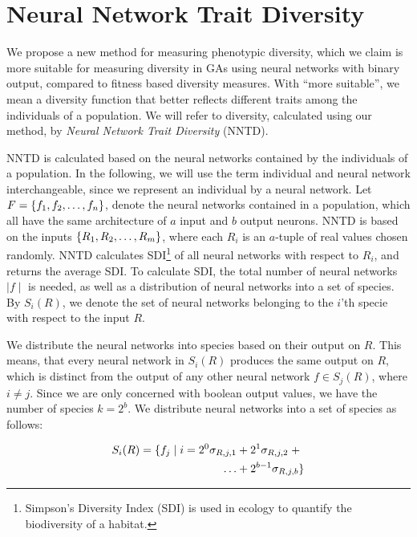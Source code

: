 \section{Neural Network Trait Diversity}
We propose a new method for measuring phenotypic diversity, which we claim is more suitable for measuring diversity in GAs using neural networks with binary output, compared to fitness based diversity measures. With ``more suitable'', we mean a diversity function that better reflects different traits among the individuals of a population. We will refer to diversity, calculated using our method, by \emph{Neural Network Trait Diversity} (NNTD).

NNTD is calculated based on the neural networks contained by the individuals of a population. In the following, we will use the term individual and neural network interchangeable, since we represent an individual by a neural network.  Let $F = \{ f_1, f_2, \dots, f_n \}$, denote the neural networks contained in a population, which all have the same architecture of $a$ input and $b$ output neurons.  NNTD is based on the inputs $\{ R_1, R_2, \dots, R_m \}$, where each $R_i$ is an $a$-tuple of real values chosen randomly. NNTD calculates SDI\footnote{Simpson's Diversity Index (SDI) is used in ecology to quantify the biodiversity of a habitat.} of all neural networks with respect to $R_i$, and returns the average SDI. To calculate SDI, the total number of neural networks $\mid f \mid$ is needed, as well as a distribution of neural networks into a set of species. By $S_i(R)$, we denote the set of neural networks belonging to the $i$'th specie with respect to the input $R$.

We distribute the neural networks into species based on their output on $R$. This means, that every neural network in $S_i(R)$ produces the same output on $R$, which is distinct from the output of any other neural network $f \in S_j(R)$, where $i \neq j$.
Since we are only concerned with boolean output values, we have the number of species $k = 2^b$. 
We distribute neural networks into a set of species as follows:

\begin{equation*}\label{eq:species}
  \begin{split}
    S_i(R) = \{ f_j \mid i = 2^0\sigma_{R,j,1} & + 2^1\sigma_{R,j,2}\; + \\
  \dots & + 2^{b-1}\sigma_{R,j,b} \}
  \end{split}
\end{equation*}

